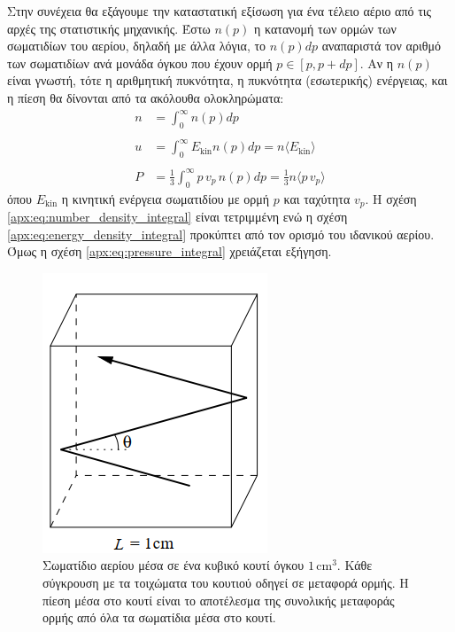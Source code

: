 Στην συνέχεια θα εξάγουμε την καταστατική εξίσωση για ένα τέλειο αέριο από τις αρχές της στατιστικής μηχανικής. Έστω $n(p)$ η κατανομή των ορμών των σωματιδίων του αερίου, δηλαδή με άλλα λόγια, το $n(p)dp$ αναπαριστά τον αριθμό των σωματιδίων ανά μονάδα όγκου που έχουν ορμή $p \in [p, p+dp]$. Αν η $n(p)$ είναι γνωστή, τότε η αριθμητική πυκνότητα, η πυκνότητα (εσωτερικής) ενέργειας, και η πίεση θα δίνονται από τα ακόλουθα ολοκληρώματα:
\begin{align}
    n &= \int_{0}^{\infty} n(p) dp \label{apx:eq:number_density_integral} \\\nonumber\\
    u &= \int_{0}^{\infty} E_{\text{kin}} n(p) dp = n \langle E_{\text{kin}} \rangle \label{apx:eq:energy_density_integral} \\\nonumber\\
    P &= \frac{1}{3}\int_{0}^{\infty} p \,v_p \,n(p) dp = \frac{1}{3} n \langle p \,v_p \rangle \label{apx:eq:pressure_integral} 
\end{align}
όπου $E_{\text{kin}}$ η κινητική ενέργεια σωματιδίου με ορμή $p$ και ταχύτητα $v_p$. Η σχέση \eqref{apx:eq:number_density_integral} είναι τετριμμένη ενώ η σχέση \eqref{apx:eq:energy_density_integral} προκύπτει από τον ορισμό του ιδανικού αερίου. Όμως η σχέση \eqref{apx:eq:pressure_integral} χρειάζεται εξήγηση.

\begin{figure}[h]
    \centering
    \includegraphics[scale = 0.6]{Figures/elastic_collision_in_a_box.png}
    \caption{Σωματίδιο αερίου μέσα σε ένα κυβικό κουτί όγκου $1 \,\text{cm}^3$. Κάθε σύγκρουση με τα τοιχώματα του κουτιού οδηγεί σε μεταφορά ορμής. Η πίεση μέσα στο κουτί είναι το αποτέλεσμα της συνολικής μεταφοράς ορμής από όλα τα σωματίδια μέσα στο κουτί.}
    \label{apx:fig:elastic_collisions}
\end{figure}

